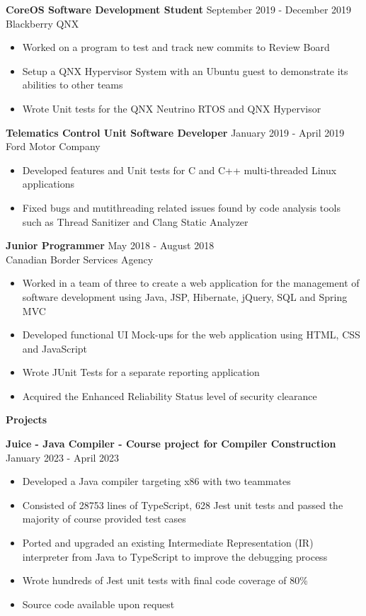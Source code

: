 \documentclass[10pt]{article}
\begin{document}
\textbf{CoreOS Software Development Student} \hfill September 2019 - December 2019 \\
Blackberry QNX
\begin{itemize}[noitemsep]
    \item Worked on a program to test and track new commits to Review Board
    \item Setup a QNX Hypervisor System with an Ubuntu guest to demonstrate its abilities to other teams
    \item Wrote Unit tests for the QNX Neutrino RTOS and QNX Hypervisor
\end{itemize}

\textbf{Telematics Control Unit Software Developer}
\hfill January 2019 - April 2019 \\ Ford Motor Company
\begin{itemize}[noitemsep]
    \item Developed features and Unit tests for C and C++ multi-threaded Linux applications
    \item Fixed bugs and mutithreading related issues found by code analysis tools such as Thread Sanitizer and Clang Static Analyzer
\end{itemize}

\textbf{Junior Programmer}
\hfill May 2018 - August 2018 \\ Canadian Border Services Agency
\begin{itemize}[noitemsep]
    \item Worked in a team of three to create a web application for the management of software development using Java, JSP, Hibernate, jQuery, SQL and Spring MVC
    \item Developed functional UI Mock-ups for the web application using HTML, CSS and JavaScript
    \item Wrote JUnit Tests for a separate reporting application
    \item Acquired the Enhanced Reliability Status level of security clearance
\end{itemize}

\newpage

{\Large\textbf{Projects}}\space \hrulefill

\textbf{Juice - Java Compiler - Course project for Compiler Construction} \hfill January 2023 - April 2023
\begin{itemize}[noitemsep]
    \item Developed a Java compiler targeting x86 with two teammates
    \item Consisted of 28753 lines of TypeScript, 628 Jest unit tests and passed the majority of course provided test cases
    \item Ported and upgraded an existing Intermediate Representation (IR) interpreter from Java to TypeScript to improve the debugging process
    \item Wrote hundreds of Jest unit tests with final code coverage of 80\%
    \item Source code available upon request
\end{itemize}
\end{document}
